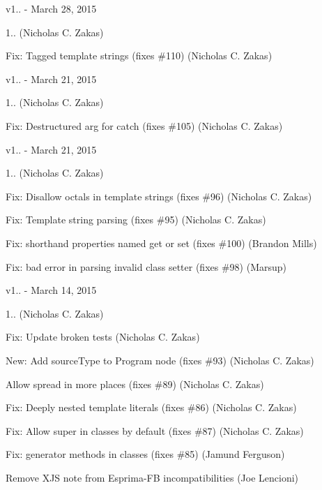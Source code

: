 v1.. -\/ March 28, 2015


\begin{DoxyItemize}
\item 1.. (Nicholas C. Zakas)
\item Fix\+: Tagged template strings (fixes \#110) (Nicholas C. Zakas)
\end{DoxyItemize}

v1.. -\/ March 21, 2015


\begin{DoxyItemize}
\item 1.. (Nicholas C. Zakas)
\item Fix\+: Destructured arg for catch (fixes \#105) (Nicholas C. Zakas)
\end{DoxyItemize}

v1.. -\/ March 21, 2015


\begin{DoxyItemize}
\item 1.. (Nicholas C. Zakas)
\item Fix\+: Disallow octals in template strings (fixes \#96) (Nicholas C. Zakas)
\item Fix\+: Template string parsing (fixes \#95) (Nicholas C. Zakas)
\item Fix\+: shorthand properties named get or set (fixes \#100) (Brandon Mills)
\item Fix\+: bad error in parsing invalid class setter (fixes \#98) (Marsup)
\end{DoxyItemize}

v1.. -\/ March 14, 2015


\begin{DoxyItemize}
\item 1.. (Nicholas C. Zakas)
\item Fix\+: Update broken tests (Nicholas C. Zakas)
\item New\+: Add source\+Type to Program node (fixes \#93) (Nicholas C. Zakas)
\item Allow spread in more places (fixes \#89) (Nicholas C. Zakas)
\item Fix\+: Deeply nested template literals (fixes \#86) (Nicholas C. Zakas)
\item Fix\+: Allow super in classes by default (fixes \#87) (Nicholas C. Zakas)
\item Fix\+: generator methods in classes (fixes \#85) (Jamund Ferguson)
\item Remove X\+JS note from Esprima-\/\+FB incompatibilities (Joe Lencioni)
\end{DoxyItemize}

